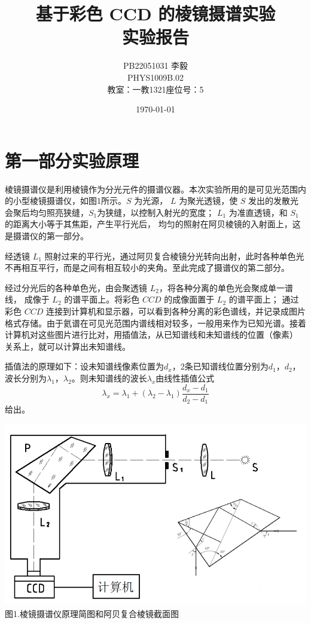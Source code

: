 \documentclass{ctexart}
\title{基于彩色 CCD 的棱镜摄谱实验\\{\large 实验报告}}
\author{\Large  PB22051031 李毅\\{\large PHYS1009B.02 }\\{教室：一教1321\quad 座位号：5}}
\date{\today}
\begin{document}
	\maketitle
    \newpage
    \section*{第一部分\quad 实验原理}
    棱镜摄谱仪是利用棱镜作为分光元件的摄谱仪器。本次实验所用的是可见光范围内的小型棱镜摄谱仪，如图1所示。$S$ 为光源， $L$ 为聚光透镜，使 $S$ 发出的发散光会聚后均匀照亮狭缝，$S_1$为狭缝，以控制入射光的宽度； $L_1$ 为准直透镜，和 $S_1$ 的距离大小等于其焦距，产生平行光后， 均匀的照射在阿贝棱镜的入射面上，这是摄谱仪的第一部分。 
    
    经透镜 $L_1$ 照射过来的平行光，通过阿贝复合棱镜分光转向出射，此时各种单色光不再相互平行，而是之间有相互较小的夹角。至此完成了摄谱仪的第二部分。

    经过分光后的各种单色光，由会聚透镜 $L_2$，将各种分离的单色光会聚成单一谱线， 成像于 $L_2$ 的谱平面上。将彩色 $CCD$ 的成像面置于 $L_2$ 的谱平面上； 通过彩色 $CCD$ 连接到计算机和显示器，可以看到各种分离的彩色谱线，并记录成图片格式存储。由于氦谱在可见光范围内谱线相对较多，一般用来作为已知光谱。接着计算机对这些图片进行比对，用插值法，从已知谱线和未知谱线的位置（像素） 关系上，就可以计算出未知谱线。
    
    插值法的原理如下：设未知谱线像素位置为$d_x$，2条已知谱线位置分别为$d_1$，$d_2$，波长分别为$\lambda_1$，$\lambda_2$。则未知谱线的波长$\lambda_x$由线性插值公式
    $$\lambda_x=\lambda_1+(\lambda_2-\lambda_1)\dfrac{d_x-d_1}{d_2-d_1}$$
给出。


    \begin{minipage}[l]{1\textwidth}
        \includegraphics[scale=1.2]{1} \\\small{图1.棱镜摄谱仪原理简图和阿贝复合棱镜截面图}\centering
    \end{minipage}
    \newpage
\end{document}
